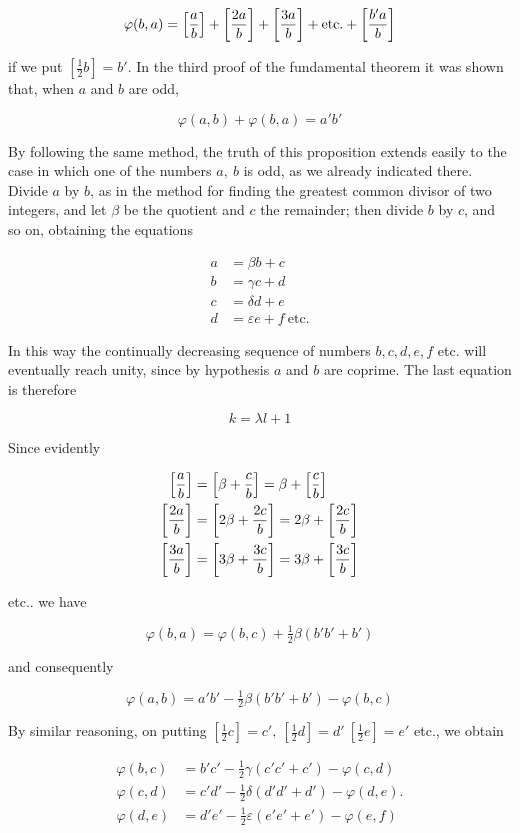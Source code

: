 \[
\varphi(b,a)=\left[\frac ab\right]+\left[\frac{2a}b\right]+\left[\frac{3a}b\right]+\text{etc.}+\left[\frac{b'a}b\right]
\]

if we put $[\frac12b]=b'$. In the third proof of the fundamental theorem it was shown that, when $a$ and $b$ are odd,

\[
\varphi(a,b)+\varphi(b,a)=a'b'
\]

By following the same method, the truth of this proposition extends easily to the case in which one of the numbers $a,\ b$ is odd, as we already indicated there. Divide $a$ by $b$, as in the method for finding the greatest common divisor of two integers, and let $\beta$ be the quotient and $c$ the remainder; then divide $b$ by $c$, and so on, obtaining the equations

%
\[
\begin{aligned}
a&=\beta b+c\\
b&=\gamma c+d\\
c&=\delta d+e\\
d&=\varepsilon e+f\ \text{etc.}
\end{aligned}
\]

In this way the continually decreasing sequence of numbers $b,c,d,e,f$ etc. will eventually reach unity, since by hypothesis $a$ and $b$ are coprime. The last equation is therefore

\[
k=\lambda l+1
\]

Since evidently

\[
\begin{aligned}
\left[\frac ab\right]&=\left[\beta+\frac cb\right]=\beta+\left[\frac cb\right]\\
\left[\frac{2a}b\right]&=\left[2\beta+\frac{2c}b\right]=2\beta+\left[\frac{2c}b\right]\\
\left[\frac{3a}b\right]&=\left[3\beta+\frac{3c}b\right]=3\beta+\left[\frac{3c}b\right]
\end{aligned}
\]

etc.. we have

\[
\varphi(b,a)=\varphi(b,c)+\tfrac12\beta(b'b'+b')
\]

and consequently

\[
\varphi(a,b)=a'b'-\tfrac12\beta(b'b'+b')-\varphi(b,c)
\]

By similar reasoning, on putting $[\frac12c]=c',\ [\frac12d]=d'\ [\frac12e]=e'$ etc., we obtain

\[
\begin{aligned}
\varphi(b,c)&=b'c'-\tfrac12\gamma(c'c'+c')-\varphi(c,d)\\
\varphi(c,d)&=c'd'-\tfrac12\delta(d'd'+d')-\varphi(d,e)\mathord{.}\\
\varphi(d,e)&=d'e'-\tfrac12\varepsilon(e'e'+e')-\varphi(e,f)
\end{aligned}
\]

